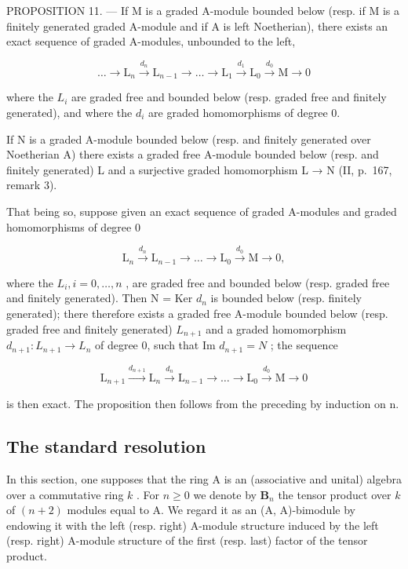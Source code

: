 PROPOSITION 11. --- If M is a graded A-module bounded below (resp. if M is a finitely generated graded A-module and if A is left Noetherian), there exists an exact sequence of graded A-modules, unbounded to the left,

\[
\dots \longrightarrow \mathrm{L} _ {n} \xrightarrow {d _ {n}} \mathrm{L} _ {n - 1} \longrightarrow \dots \longrightarrow \mathrm{L} _ {1} \xrightarrow {d _ {1}} \mathrm{L} _ {0} \xrightarrow {d _ {0}} \mathrm{M} \longrightarrow 0
\]

where the \(L_{i}\) are graded free and bounded below (resp. graded free and finitely generated), and where the \(d_{i}\) are graded homomorphisms of degree 0.

If N is a graded A-module bounded below (resp. and finitely generated over Noetherian A) there exists a graded free A-module bounded below (resp. and finitely generated) L and a surjective graded homomorphism L → N (II, p.~167, remark 3).

That being so, suppose given an exact sequence of graded A-modules and graded homomorphisms of degree 0

\[
\mathrm{L} _ {n} \xrightarrow {d _ {n}} \mathrm{L} _ {n - 1} \longrightarrow \dots \longrightarrow \mathrm{L} _ {0} \xrightarrow {d _ {0}} \mathrm{M} \longrightarrow 0,
\]

where the \(L_{i}, i = 0, \ldots, n\) , are graded free and bounded below (resp. graded free and finitely generated). Then N = Ker \(d_{n}\) is bounded below (resp. finitely generated); there therefore exists a graded free A-module bounded below (resp. graded free and finitely generated) \(L_{n+1}\) and a graded homomorphism \(d_{n+1}: L_{n+1} \to L_{n}\) of degree 0, such that Im \(d_{n+1} = N\) ; the sequence

\[
\mathrm{L} _ {n + 1} \xrightarrow {d _ {n + 1}} \mathrm{L} _ {n} \xrightarrow {d _ {n}} \mathrm{L} _ {n - 1} \longrightarrow \dots \longrightarrow \mathrm{L} _ {0} \xrightarrow {d _ {0}} \mathrm{M} \longrightarrow 0
\]

is then exact. The proposition then follows from the preceding by induction on n.

\subsection{The standard resolution}

In this section, one supposes that the ring A is an (associative and unital) algebra over a commutative ring \(k\) . For \(n \geqslant 0\) we denote by \(\mathbf{B}_n\) the tensor product over \(k\) of \((n + 2)\) modules equal to A. We regard it as an (A, A)-bimodule by endowing it with the left (resp. right) A-module structure induced by the left (resp. right) A-module structure of the first (resp. last) factor of the tensor product.

